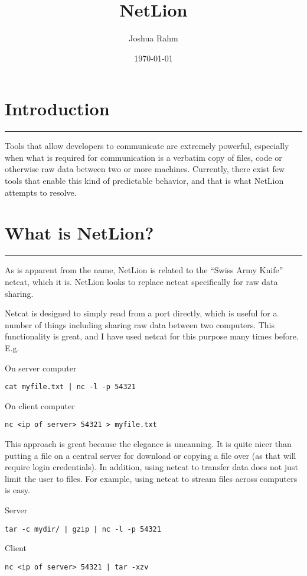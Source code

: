 \documentclass{scrartcl}
\title{NetLion}
\author{Joshua Rahm}
\date{\today}
\begin{document}
\maketitle
\newpage

\newcommand{\newsection}[1]{
	\section{#1}
	\vspace{3mm}
	\hrule
	\vspace{3mm}
}

\newsection{Introduction}

Tools that allow developers to communicate are extremely powerful, especially when what
is required for communication is a verbatim copy of files, code or otherwise raw data
between two or more machines. Currently, there exist few tools that enable this kind
of predictable behavior, and that is what NetLion attempts to resolve.

\newsection{What is NetLion?}

As is apparent from the name, NetLion is related to the ``Swiss Army Knife'' netcat, which
it is. NetLion looks to replace netcat specifically for raw data sharing.

Netcat is designed to simply read from a port directly, which is useful for a number of things
including sharing raw data between two computers. This functionality is great, and I have
used netcat for this purpose many times before. E.g.

On server computer
\begin{verbatim}
cat myfile.txt | nc -l -p 54321
\end{verbatim}

On client computer
\begin{verbatim}
nc <ip of server> 54321 > myfile.txt
\end{verbatim}

This approach is great because the elegance is uncanning. It is quite nicer than
putting a file on a central server for download or copying a file over (as that will
require login credentials). In addition, using netcat to transfer data does not
just limit the user to files. For example, using netcat to stream files across computers
is easy.

Server
\begin{verbatim}
tar -c mydir/ | gzip | nc -l -p 54321
\end{verbatim}

Client
\begin{verbatim}
nc <ip of server> 54321 | tar -xzv
\end{verbatim}
\end{document}
